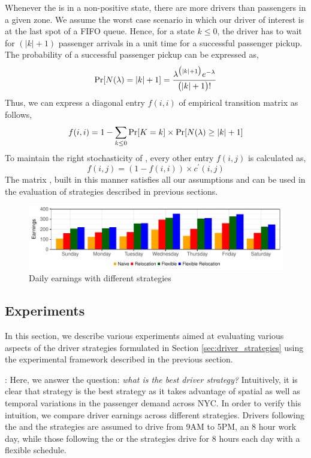 Whenever the {\markovchain} is in a non-positive state, there are more drivers than passengers in a given zone. We assume the worst case scenario in which our driver of interest is at the last spot of a FIFO queue. Hence, for a state $k \leq 0$, the driver has to wait for $(|k| + 1)$ passenger arrivals in a unit time for a successful passenger pickup. The probability of a successful passenger pickup can be expressed as,
\begin{equation}
\Pr[N(\lambda) = |k| + 1] = \frac{\lambda^{\big(|k|+1\big)} e^{-\lambda}}{\big(|k| + 1\big)!}
\end{equation}
Thus, we can express a diagonal entry $f(i,i)$ of empirical transition matrix as follows,
\begin{equation}
f(i,i) = 1 - \sum_{k \leq 0} \Pr[K = k] \times \Pr[N(\lambda) \geq |k| + 1]
\end{equation}
To maintain the right stochasticity of {\empiricaltransitionmatrix}, every other entry $f(i,j)$ is calculated as,
\begin{equation}
f(i,j) = (1 - f(i,i)) \times c^\prime(i,j)
\end{equation}
The matrix {\empiricaltransitionmatrix}, built in this manner satisfies all our assumptions and can be used in the evaluation of strategies described in previous sections.

\begin{figure}
	\centering
	\caption{Daily earnings with different strategies}
	\label{fig:daily_earnings}
	\includegraphics{figures/daily_earnings.pdf}
\end{figure}

\subsection{Experiments}
In this section, we describe various experiments aimed at evaluating various aspects of the driver strategies formulated in Section \ref{sec:driver_strategies} using the experimental framework described in the previous section.

: Here, we answer the question: \textit{what is the best driver strategy?} Intuitively, it is clear that {\relocationflexible} strategy is the best strategy as it takes advantage of spatial as well as temporal variations in the passenger demand across NYC. In order to verify this intuition, we compare driver earnings across different strategies. Drivers following the {\naive} and the {\relocation} strategies are assumed to drive from 9AM to 5PM, an 8 hour work day, while those following the {\flexible} or the {\relocationflexible} strategies drive for 8 hours each day with a flexible schedule.

